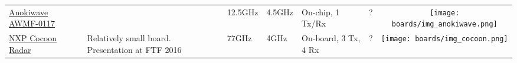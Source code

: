 \begin{longtable}[]{@{}llllllc@{}}
\begin{minipage}[t]{\colwidthA}\raggedright\strut
	\href{http://www.anokiwave.com/products/awmf-0117/index.html}{Anokiwave AWMF-0117}
\strut\end{minipage} &
\begin{minipage}[t]{\colwidthB}\raggedright\strut

\strut\end{minipage} &
\begin{minipage}[t]{\colwidthC}\raggedright\strut
12.5GHz
\strut\end{minipage} &
\begin{minipage}[t]{\colwidthD}\raggedright\strut
4.5GHz
\strut\end{minipage} &
\begin{minipage}[t]{\colwidthE}\raggedright\strut
On-chip, 1 Tx/Rx
\strut\end{minipage} &
\begin{minipage}[t]{\colwidthF}\raggedright\strut
?
\strut\end{minipage} &
\begin{minipage}[t]{\colwidthG}\centering\strut
\texttt{[image: boards/img\_anokiwave.png]}
\strut\end{minipage}\tabularnewline

\begin{minipage}[t]{\colwidthA}\raggedright\strut
	\href{Reuter2016}{NXP Cocoon Radar}
\strut\end{minipage} &
\begin{minipage}[t]{\colwidthB}\raggedright\strut
Relatively small board. Presentation at FTF 2016\cite{Reuter2016}
\strut\end{minipage} &
\begin{minipage}[t]{\colwidthC}\raggedright\strut
77GHz
\strut\end{minipage} &
\begin{minipage}[t]{\colwidthD}\raggedright\strut
4GHz
\strut\end{minipage} &
\begin{minipage}[t]{\colwidthE}\raggedright\strut
On-board, 3 Tx, 4 Rx
\strut\end{minipage} &
\begin{minipage}[t]{\colwidthF}\raggedright\strut
?
\strut\end{minipage} &
\begin{minipage}[t]{\colwidthG}\centering\strut
\texttt{[image: boards/img\_cocoon.png]}
\strut\end{minipage}\tabularnewline


\end{longtable}
